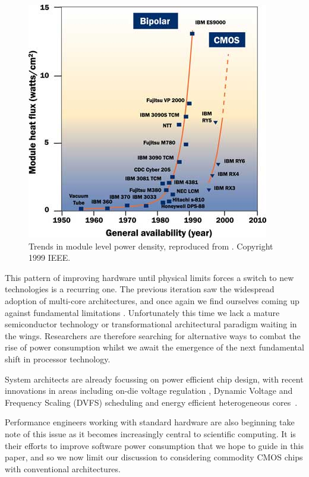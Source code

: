 \begin{figure}[ht]
\centering
\includegraphics[width=0.9\linewidth]{Images/bipolarcmos.jpg}
\caption{Trends in module level power density, reproduced from \cite{chu:1999aa}. Copyright 1999 IEEE.}
\end{figure}
This pattern of improving hardware until physical limits forces a switch to new technologies is a recurring one. The previous iteration saw the widespread adoption of multi-core architectures, and once again we find ourselves coming up against fundamental limitations \cite{esmaeilzadeh:2011aa}. Unfortunately this time we lack a mature semiconductor technology or transformational architectural paradigm waiting in the wings. Researchers are therefore searching for alternative ways to combat the rise of power consumption whilst we await the emergence of the next fundamental shift in processor technology. \golden

System architects are already focussing on power efficient chip design, with recent innovations in areas including on-die voltage regulation \cite{burton:2014aa}, Dynamic Voltage and Frequency Scaling (DVFS) scheduling \cite{kwon:2013aa} and energy efficient heterogeneous cores~\cite{gupta:2012aa}.\golden

Performance engineers working with standard hardware are also beginning take note of this issue as it becomes increasingly central to scientific computing. It is their efforts to improve software power consumption that we hope to guide in this paper, and so we now limit our discussion to considering commodity CMOS chips with conventional architectures. \golden

